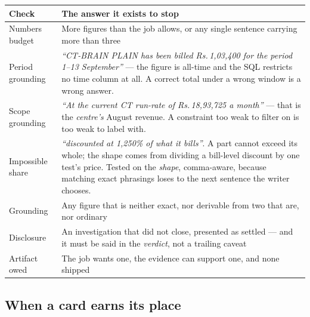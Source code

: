 \documentclass[11pt,a4paper]{report}
\newcommand{\rs}[1]{Rs.\,#1}
\begin{document}
\begin{center}
\small
\begin{tabular}{@{}p{4.0cm}p{10.8cm}@{}}
\toprule
\textbf{Check} & \textbf{The answer it exists to stop}\\
\midrule
Numbers budget & More figures than the job allows, or any single sentence carrying more than three\\
Period grounding & \emph{``CT-BRAIN PLAIN has been billed \rs{1{,}03{,}400} for the period 1--13
 September''} --- the figure is all-time and the SQL restricts no time column at all. A correct
 total under a wrong window is a wrong answer.\\
Scope grounding & \emph{``At the current CT run-rate of \rs{18{,}93{,}725} a month''} --- that is
 the \emph{centre's} August revenue. A constraint too weak to filter on is too weak to label with.\\
Impossible share & \emph{``discounted at 1{,}250\% of what it bills''}. A part cannot exceed its
 whole; the shape comes from dividing a bill-level discount by one test's price. Tested on the
 \emph{shape}, comma-aware, because matching exact phrasings loses to the next sentence the writer
 chooses.\\
Grounding & Any figure that is neither exact, nor derivable from two that are, nor ordinary\\
Disclosure & An investigation that did not close, presented as settled --- and it must be said in
 the \emph{verdict}, not a trailing caveat\\
Artifact owed & The job wants one, the evidence can support one, and none shipped\\
\bottomrule
\end{tabular}
\end{center}

\subsection{When a card earns its place}
\end{document}
